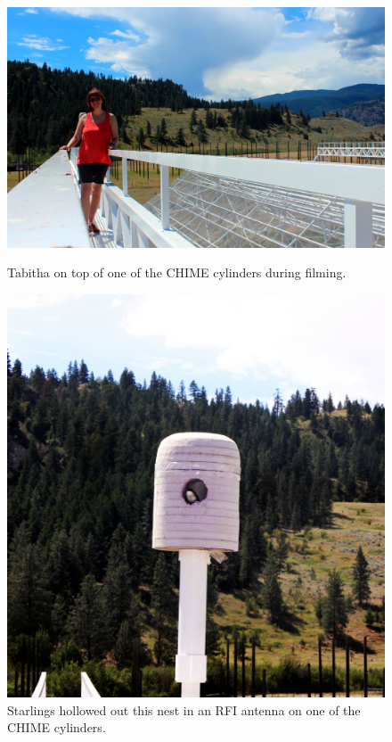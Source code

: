 \begin{figure}[htb]
\centering
\begin{minipage}[b]{0.57\textwidth}
\centering
\includegraphics[width=0.95\linewidth]{Planetarium/figures/Filming_at_CHIME.jpg}
\caption{Tabitha on top of one of the CHIME cylinders during filming. }
\label{Fig:CHIME_film}
\end{minipage}%
\begin{minipage}[b]{0.02\textwidth}
\hspace{1cm}
\end{minipage}%
\begin{minipage}[b]{0.37\textwidth}
\centering
\includegraphics[width=0.95\linewidth]{Planetarium/figures/CHIME_birdsnest.jpg}
\caption{Starlings hollowed out this nest in an RFI antenna on one of the CHIME cylinders.}
\label{Fig:CHIME_bird}
\end{minipage}
\end{figure}

